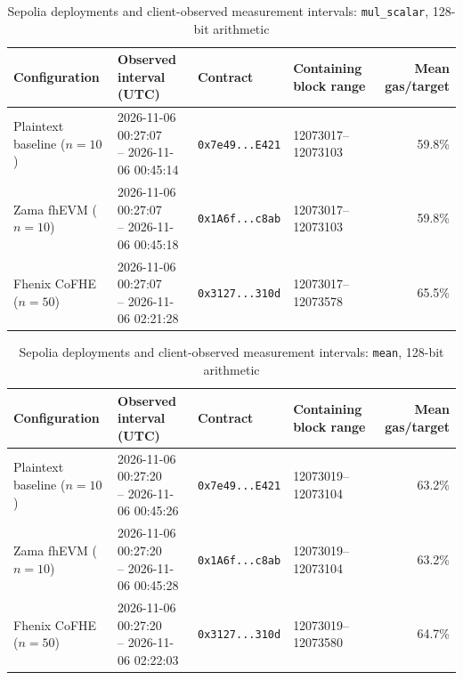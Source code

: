 \begin{table}[!t]
\caption{Sepolia deployments and client-observed measurement intervals: \texttt{mul\_scalar}, 128-bit arithmetic}
\label{tab:sepolia-client-intervals-classic-euint128-mul-scalar}
\centering
\footnotesize
\setlength{\tabcolsep}{4pt}
\begin{tabular}{|l|l|l|l|r|}
\hline
\textbf{Configuration} &
\textbf{Observed interval (UTC)} &
\textbf{Contract} &
\textbf{Containing block range} &
\textbf{Mean gas/target} \\
\hline
Plaintext baseline (\(n=10\)) &
\shortstack[l]{2026-11-06 00:27:07 \\ -- 2026-11-06 00:45:14} &
\texttt{0x7e49...E421} &
12073017--12073103 &
59.8\% \\
\hline
Zama fhEVM (\(n=10\)) &
\shortstack[l]{2026-11-06 00:27:07 \\ -- 2026-11-06 00:45:18} &
\texttt{0x1A6f...c8ab} &
12073017--12073103 &
59.8\% \\
\hline
Fhenix CoFHE (\(n=50\)) &
\shortstack[l]{2026-11-06 00:27:07 \\ -- 2026-11-06 02:21:28} &
\texttt{0x3127...310d} &
12073017--12073578 &
65.5\% \\
\hline
\end{tabular}
\end{table}

\begin{table}[!t]
\caption{Sepolia deployments and client-observed measurement intervals: \texttt{mean}, 128-bit arithmetic}
\label{tab:sepolia-client-intervals-classic-euint128-mean}
\centering
\footnotesize
\setlength{\tabcolsep}{4pt}
\begin{tabular}{|l|l|l|l|r|}
\hline
\textbf{Configuration} &
\textbf{Observed interval (UTC)} &
\textbf{Contract} &
\textbf{Containing block range} &
\textbf{Mean gas/target} \\
\hline
Plaintext baseline (\(n=10\)) &
\shortstack[l]{2026-11-06 00:27:20 \\ -- 2026-11-06 00:45:26} &
\texttt{0x7e49...E421} &
12073019--12073104 &
63.2\% \\
\hline
Zama fhEVM (\(n=10\)) &
\shortstack[l]{2026-11-06 00:27:20 \\ -- 2026-11-06 00:45:28} &
\texttt{0x1A6f...c8ab} &
12073019--12073104 &
63.2\% \\
\hline
Fhenix CoFHE (\(n=50\)) &
\shortstack[l]{2026-11-06 00:27:20 \\ -- 2026-11-06 02:22:03} &
\texttt{0x3127...310d} &
12073019--12073580 &
64.7\% \\
\hline
\end{tabular}
\end{table}

